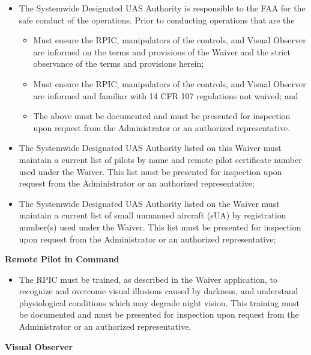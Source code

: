\documentclass[
]{book}
\providecommand{\tightlist}{%
  \setlength{\itemsep}{0pt}\setlength{\parskip}{0pt}}
\begin{document}
\begin{itemize}
\item
  The Systemwide Designated UAS Authority is responsible to the FAA for the safe conduct of the operations. Prior to conducting operations that are the

  \begin{itemize}
  \tightlist
  \item
    Must ensure the RPIC, manipulators of the controls, and Visual Observer are informed on the terms and provisions of the Waiver and the strict observance of the terms and provisions herein;
  \item
    Must ensure the RPIC, manipulators of the controls, and Visual Observer are informed and familiar with 14 CFR 107 regulations not waived; and
  \item
    The above must be documented and must be presented for inspection upon request from the Administrator or an authorized representative.
  \end{itemize}
\item
  The Systemwide Designated UAS Authority listed on this Waiver must maintain a current list of pilots by name and remote pilot certificate number used under the Waiver. This list must be presented for inspection upon request from the Administrator or an authorized representative;
\item
  The Systemwide Designated UAS Authority listed on the Waiver must maintain a current list of small unmanned aircraft (sUA) by registration number(s) used under the Waiver. This list must be presented for inspection upon request from the Administrator or an authorized representative;
\end{itemize}

\textbf{Remote Pilot in Command}

\begin{itemize}
\tightlist
\item
  The RPIC must be trained, as described in the Waiver application, to recognize and overcome visual illusions caused by darkness, and understand physiological conditions which may degrade night vision. This training must be documented and must be presented for inspection upon request from the Administrator or an authorized representative.
\end{itemize}

\textbf{Visual Observer}
\end{document}
